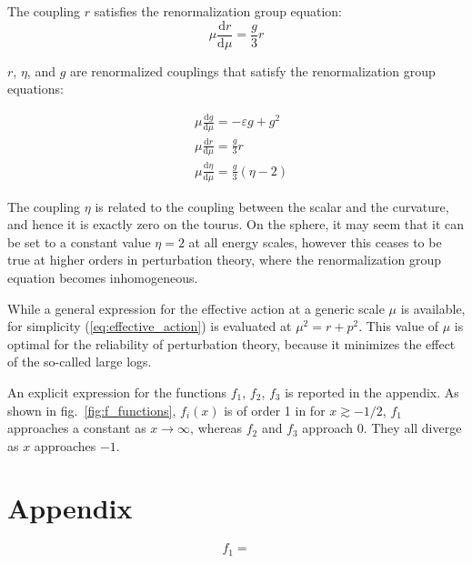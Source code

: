 \documentclass[11pt,a4paper]{article}
\newcommand{\dd}{\mathrm{d}}
\begin{document}
The coupling $r$ satisfies the renormalization group equation:
\begin{equation}
  \mu \frac{\dd r}{\dd \mu} = \frac{g}{3}r
\end{equation}

$r$, $\eta$, and $g$ are renormalized couplings
that satisfy the renormalization group equations:

\begin{align}
  &\mu \frac{\dd g}{\dd \mu} = -\varepsilon g + g^2 \\
  &\mu \frac{\dd r}{\dd \mu} = \frac{g}{3}r \\
  &\mu \frac{\dd \eta}{\dd \mu} = \frac{g}{3}(\eta - 2)
\end{align}

The coupling $\eta$ is related to the coupling between the scalar and
the curvature, and hence it is exactly zero on the tourus. On the sphere, it
may seem that it can be set to a constant value $\eta = 2$ at all energy
scales, however this ceases to be true at higher orders in perturbation theory,
where the renormalization group equation becomes inhomogeneous.

While a general expression for the effective action at a generic scale $\mu$ is
available, for simplicity (\ref{eq:effective_action}) is evaluated at $\mu^2
= r + p^2$. This value of $\mu$ is optimal for the reliability of perturbation
theory, because it minimizes the effect of the so-called large logs.

An explicit expression for the functions $f_1$, $f_2$, $f_3$ is reported in the
appendix. As shown in fig.~\ref{fig:f_functions}, $f_i(x)$ is of order 1 in for
$x \gtrsim -1/2$, $f_1$ approaches a constant as $x \to \infty$, whereas
$f_2$ and $f_3$ approach 0. They all diverge as $x$ approaches $-1$.
\section{Appendix}


\begin{equation}
\label{eq:f_functions}
f_1 = 
\end{equation}
\end{document}
